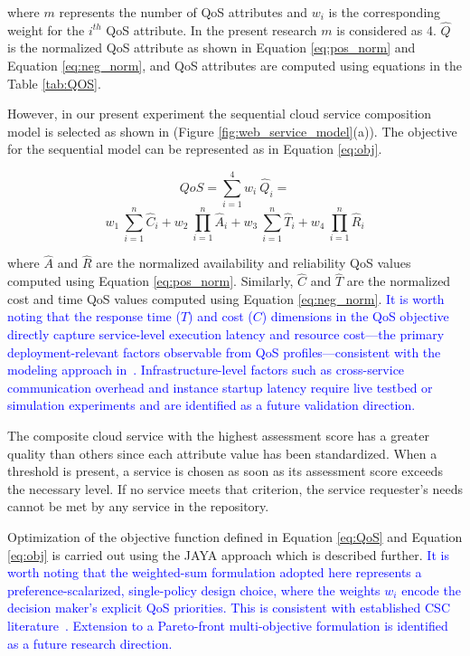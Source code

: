 \documentclass[3p,twocolumn]{elsarticle}
\theoremstyle{thmstyleone}%
\theoremstyle{thmstyletwo}%
\theoremstyle{thmstylethree}%
\begin{document}
where $m$ represents the number of QoS attributes and $w_i$ is the corresponding weight for the $i^{th}$ QoS attribute. In the present research $m$ is considered as 4. $\hat{Q}$ is the normalized QoS attribute as shown in Equation \ref{eq:pos_norm} and Equation \ref{eq:neg_norm}, and QoS attributes are computed using equations in the Table \ref{tab:QOS}.

However, in our present experiment the sequential cloud service composition  model is selected as shown in (Figure \ref{fig:web_service_model}(a)). The objective for the sequential model can be represented as in Equation \ref{eq:obj}.

\begin{equation*}
QoS = \sum_{i=1}^{4} w_i ~ \hat{Q}_i =
\label{eq:obj}
\end{equation*}
\begin{equation}
w_1~\sum_{i=1}^{n} \hat{C}_i + w_2~\prod_{i=1}^{n} \hat{A}_i + w_3~\sum_{i=1}^{n} \hat{T}_i + w_4~\prod_{i=1}^{n} \hat{R}_i
\label{eq:obj}
\end{equation}


where $\hat{A}$ and $\hat{R}$ are the normalized availability and reliability QoS values computed using Equation \ref{eq:pos_norm}. Similarly, $\hat{C}$ and $\hat{T}$ are the normalized cost and time QoS values computed using Equation \ref{eq:neg_norm}. \textcolor{blue}{It is worth noting that the response time ($T$) and cost ($C$) dimensions in the QoS objective directly capture 
service-level execution latency and resource cost---the primary deployment-relevant factors observable from QoS profiles---consistent with the modeling approach in~\cite{zeng2004qos, 
eisa2020modelling}. Infrastructure-level factors such as cross-service communication overhead and instance startup latency require live testbed or simulation experiments and are identified 
as a future validation direction.}

The composite cloud service with the highest assessment score has a greater quality than others since each attribute value has been standardized. When a threshold is present, a service is chosen as soon as its assessment score exceeds the necessary level. If no service meets that criterion, the service requester's needs cannot be met by any service in the repository.

Optimization of the objective function defined in Equation \ref{eq:QoS} 
and Equation \ref{eq:obj} is carried out using the JAYA approach which 
is described further. \textcolor{blue}{It is worth noting that the 
weighted-sum formulation adopted here represents a preference-scalarized, 
single-policy design choice, where the weights $w_i$ encode the 
decision maker's explicit QoS priorities. This is consistent with 
established CSC literature~\cite{jatoth2019optimal, gavvala2019qos, 
haytamy2020deep, eisa2020modelling}. Extension to a Pareto-front 
multi-objective formulation is identified as a future research direction.}
\end{document}
